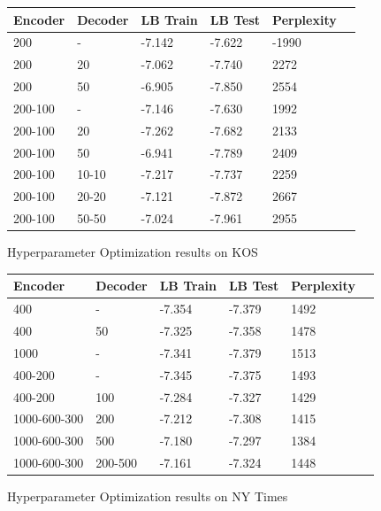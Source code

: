 \documentclass{report}
\begin{document}
	\begin{figure}\caption{Hyperparameter Optimization results on KOS}
		\begin{tabular}{l l|l l |l l }\label{HO_KOS} 		
			Encoder & Decoder & LB Train & LB Test & Perplexity  	\\
			\hline
			200 & -		& -7.142 & \color{red} -7.622 & \color{red} -1990 \\
			
			200 & 20	& -7.062 & -7.740 & 2272 \\
			
			200 & 50	& \color{red} -6.905 & -7.850 & 2554 \\
			
			200-100 & -	& -7.146 & -7.630 & 1992 \\
			
			200-100 & 20	& -7.262 & -7.682 & 2133 \\
			
			200-100 & 50	& -6.941 & -7.789 & 2409 \\
			
			200-100 & 10-10	& -7.217 & -7.737 & 2259 \\
			
			200-100 & 20-20	& -7.121 & -7.872 & 2667 \\
			
			200-100 & 50-50	& -7.024 & -7.961 & 2955 \\
			
		\end{tabular}
	\end{figure}	
	
	\begin{figure}\caption{Hyperparameter Optimization results on NY Times}
	\begin{tabular}{l l|l l |l l }\label{HO_NY} 		
		Encoder & Decoder & LB Train & LB Test & Perplexity  	\\
		\hline
		400 & -		& -7.354 & -7.379 & 1492 \\

		400 & 50	& -7.325 & -7.358 & 1478 \\

		1000 & -	& -7.341 & -7.379 & 1513 \\
	
		400-200 & -	& -7.345 & -7.375 & 1493 \\

		400-200 & 100	& -7.284 & -7.327 & 1429 \\

		1000-600-300 & 200	& -7.212 & -7.308 & 1415 \\
		
		1000-600-300 & 500	& -7.180 & \color{red}-7.297 & \color{red}1384 \\
		
		1000-600-300 & 200-500	& \color{red} -7.161 & -7.324 & 1448 \\

	\end{tabular}
\end{figure}	
\end{document}
